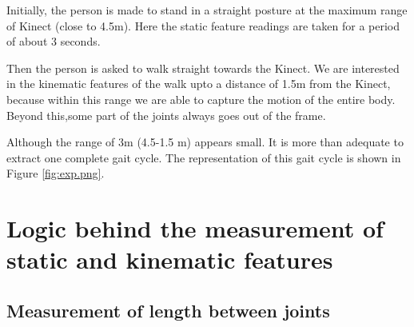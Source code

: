 \noindent Initially, the person is made to stand in a straight posture at the maximum range of Kinect (close to 4.5m). Here the static feature readings are taken for a period of about 3 seconds.

\noindent Then the person is asked to walk straight towards the Kinect. We are interested in the kinematic features of the walk upto a distance of 1.5m from the Kinect, because within this range we are able to capture the motion of the entire body. Beyond this,some part of the joints always goes out of the frame.

\noindent Although the range of 3m (4.5-1.5 m) appears small. It is more than adequate to extract one complete gait cycle. The representation of this gait cycle is shown in Figure \ref{fig:exp.png}.

\newpage

\section{Logic behind the measurement of static and kinematic features}\label{Logic behind the measurement of static and kinematic features} 
\subsection{Measurement of length between joints}\label{Measurement of length between joints} 


